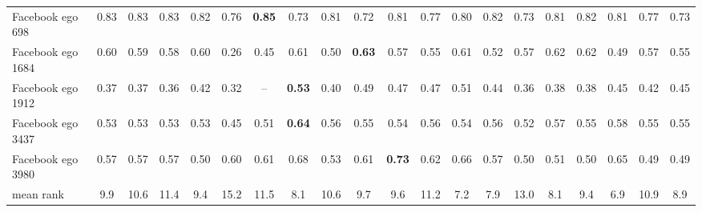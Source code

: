 \begin{table}[p]
\begin{ruledtabular}
\begin{tabular}{lccccccccccccccccccc}
Facebook ego 698 & 0.83 & 0.83 & 0.83 & 0.82 & 0.76 & \textbf{0.85} & 0.73 & 0.81 & 0.72 & 0.81 & 0.77 & 0.80 & 0.82 & 0.73 & 0.81 & 0.82 & 0.81 & 0.77 & 0.73 \\
Facebook ego 1684 & 0.60 & 0.59 & 0.58 & 0.60 & 0.26 & 0.45 & 0.61 & 0.50 & \textbf{0.63} & 0.57 & 0.55 & 0.61 & 0.52 & 0.57 & 0.62 & 0.62 & 0.49 & 0.57 & 0.55 \\
Facebook ego 1912 & 0.37 & 0.37 & 0.36 & 0.42 & 0.32 & -- & \textbf{0.53} & 0.40 & 0.49 & 0.47 & 0.47 & 0.51 & 0.44 & 0.36 & 0.38 & 0.38 & 0.45 & 0.42 & 0.45 \\
Facebook ego 3437 & 0.53 & 0.53 & 0.53 & 0.53 & 0.45 & 0.51 & \textbf{0.64} & 0.56 & 0.55 & 0.54 & 0.56 & 0.54 & 0.56 & 0.52 & 0.57 & 0.55 & 0.58 & 0.55 & 0.55 \\
Facebook ego 3980 & 0.57 & 0.57 & 0.57 & 0.50 & 0.60 & 0.61 & 0.68 & 0.53 & 0.61 & \textbf{0.73} & 0.62 & 0.66 & 0.57 & 0.50 & 0.51 & 0.50 & 0.65 & 0.49 & 0.49 \\
\hline
mean rank & 9.9 & 10.6 & 11.4 & 9.4 & 15.2 & 11.5 & 8.1 & 10.6 & 9.7 & 9.6 & 11.2 & 7.2 & 7.9 & 13.0 & 8.1 & 9.4 & 6.9 & 10.9 & 8.9 \\
\end{tabular}
\end{ruledtabular}
\end{table}
